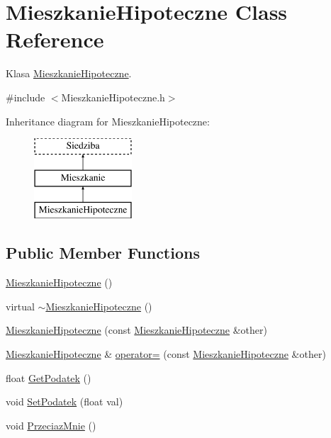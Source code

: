 \hypertarget{class_mieszkanie_hipoteczne}{}\section{Mieszkanie\+Hipoteczne Class Reference}
\label{class_mieszkanie_hipoteczne}


Klasa \hyperlink{class_mieszkanie_hipoteczne}{Mieszkanie\+Hipoteczne}.  




{\ttfamily \#include $<$Mieszkanie\+Hipoteczne.\+h$>$}

Inheritance diagram for Mieszkanie\+Hipoteczne\+:\begin{figure}[H]
\begin{center}
\leavevmode
\includegraphics[height=3.000000cm]{class_mieszkanie_hipoteczne}
\end{center}
\end{figure}
\subsection*{Public Member Functions}
\begin{DoxyCompactItemize}
\item 
\hyperlink{class_mieszkanie_hipoteczne_aaa29d6a57a58d5993272f2a33c1bcad4}{Mieszkanie\+Hipoteczne} ()
\item 
virtual \hyperlink{class_mieszkanie_hipoteczne_a5e60ac18ab28467e23c0c4c980d48808}{$\sim$\+Mieszkanie\+Hipoteczne} ()
\item 
\hyperlink{class_mieszkanie_hipoteczne_ac79bd832402d66069d71ca1ca194af21}{Mieszkanie\+Hipoteczne} (const \hyperlink{class_mieszkanie_hipoteczne}{Mieszkanie\+Hipoteczne} \&other)
\item 
\hyperlink{class_mieszkanie_hipoteczne}{Mieszkanie\+Hipoteczne} \& \hyperlink{class_mieszkanie_hipoteczne_ae07e5624429cac150e407919d23f71cd}{operator=} (const \hyperlink{class_mieszkanie_hipoteczne}{Mieszkanie\+Hipoteczne} \&other)
\item 
float \hyperlink{class_mieszkanie_hipoteczne_ac4b1e687881c20d9caa088fc8fe65257}{Get\+Podatek} ()
\item 
void \hyperlink{class_mieszkanie_hipoteczne_a57729af61fa1b75f452d6f4a1199338b}{Set\+Podatek} (float val)
\item 
void \hyperlink{class_mieszkanie_hipoteczne_a54b4efeba76c6f179e4f1d5331892c2c}{Przeciaz\+Mnie} ()
\end{DoxyCompactItemize}
